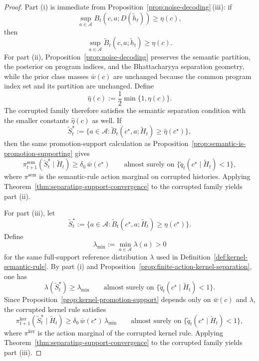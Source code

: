 \documentclass[11pt]{article}
\theoremstyle{definition}
\theoremstyle{remark}
\newcommand{\Acal}{\mathcal{A}}
\begin{document}
\begin{proof}
Part \textup{(i)} is immediate from Proposition~\ref{prop:noise-decoding}\,\textup{(iii)}: if
\[
\sup_{a\in\Acal}B_t(c,a;D(\widetilde h_t))\ge \eta(c),
\]
then
\[
\sup_{a\in\Acal}\widetilde B_t(c,a;\widetilde h_t)\ge \eta(c).
\]
For part \textup{(ii)}, Proposition~\ref{prop:noise-decoding} preserves the semantic partition, the posterior on program indices, and the Bhattacharyya separation geometry, while the prior class masses $\bar w(c)$ are unchanged because the common program index set and its partition are unchanged. Define
\[
\hat\eta(c):=\frac{1}{2}\min\{1,\eta(c)\}.
\]
The corrupted family therefore satisfies the semantic separation condition with the smaller constants $\hat\eta(c)$ as well. If
\[
\widetilde S_t^\star:=\{a\in\Acal:\widetilde B_t(c^\star,a;\widetilde H_t)\ge \hat\eta(c^\star)\},
\]
then the same promotion-support calculation as Proposition~\ref{prop:semantic-is-promotion-supporting} gives
\[
\pi_{t+1}^{\mathrm{sem}}(\widetilde S_t^\star\mid \widetilde H_t)\ge \delta_0\,\bar w(c^\star)
\qquad\text{almost surely on }\{\widetilde q_t(c^\star\mid \widetilde H_t)<1\},
\]
where $\pi^{\mathrm{sem}}$ is the semantic-rule action marginal on corrupted histories. Applying Theorem~\ref{thm:separating-support-convergence} to the corrupted family yields part \textup{(ii)}.

For part \textup{(iii)}, let
\[
\widetilde S_t^\star:=\{a\in\Acal:\widetilde B_t(c^\star,a;\widetilde H_t)\ge \eta(c^\star)\}.
\]
Define
\[
\lambda_{\min}:=\min_{a\in\Acal}\lambda(a)>0
\]
for the same full-support reference distribution $\lambda$ used in Definition~\ref{def:kernel-semantic-rule}. By part \textup{(i)} and Proposition~\ref{prop:finite-action-kernel-separation}, one has
\[
\lambda(\widetilde S_t^\star)\ge \lambda_{\min}
\qquad\text{almost surely on }\{\widetilde q_t(c^\star\mid \widetilde H_t)<1\}.
\]
Since Proposition~\ref{prop:kernel-promotion-support} depends only on $\bar w(c)$ and $\lambda$, the corrupted kernel rule satisfies
\[
\pi_{t+1}^{\mathrm{ker}}(\widetilde S_t^\star\mid \widetilde H_t)\ge \delta_0\,\bar w(c^\star)\,\lambda_{\min}
\qquad\text{almost surely on }\{\widetilde q_t(c^\star\mid \widetilde H_t)<1\},
\]
where $\pi^{\mathrm{ker}}$ is the action marginal of the corrupted kernel rule. Applying Theorem~\ref{thm:separating-support-convergence} to the corrupted family yields part \textup{(iii)}.


\end{proof}
\end{document}

